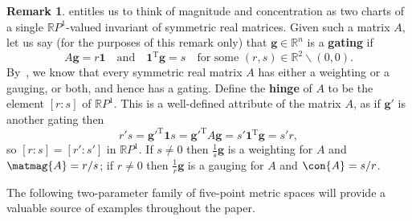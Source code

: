 \documentclass[a4paper, oneside, reqno]{amsart}
\theoremstyle{definition}
\newtheorem{remark}[theorem]{Remark}
\theoremstyle{remark}
\numberwithin{equation}{section}
\renewcommand{\vec}{\mathbf}
\newcommand{\onevector}{\mathbf{1}}
\newcommand{\transpose}{\mathrm{T}}
\newcommand{\R}{\mathbb{R}}
\newcommand{\define}{\textbf}
\begin{document}
\begin{remark}
\label{rem:malue_RP1}
 entitles us to think of magnitude and concentration as two charts of a single \(\R P^1\)-valued invariant of symmetric real matrices. Given such a matrix \(A\), let us say (for the purposes of this remark only) that \(\vec{g} \in \R^n\) is a \define{gating} if 
    \[
    A \vec{g} = r \onevector
    \quad
    \text{and}
    \quad
    \onevector^\transpose \vec{g} = s
    \quad
    \text{for some } 
    (r, s) \in \R^2 \backslash (0, 0).
    \]
By~, we know that every symmetric real matrix \(A\) has either a weighting or a gauging, or both, and hence has a gating. Define the \define{hinge} of \(A\) to be the element \([r : s]\) of \(\R P^1\). This is a well-defined attribute of the matrix \(A\), as if \(\vec{g}'\) is another gating then 
\[r's = \vec{g}'^\transpose \onevector s =  \vec{g}'^\transpose A \vec{g} =  s' \onevector^\transpose \vec{g} = s' r,\] 
so \([r : s] = [r' : s']\) in \(\R P^1\).  If \(s \not = 0\) then \(\frac{1}{s} \vec{g}\) is a weighting for \(A\) and \(\matmag{A} = r/s\); if \(r \not = 0\) then \(\frac{1}{r} \vec{g}\) is a gauging for \(A\) and \(\con{A} = s/r\).
\end{remark}

The following two-parameter family of five-point metric spaces will provide a valuable source of examples throughout the paper.
\end{document}
